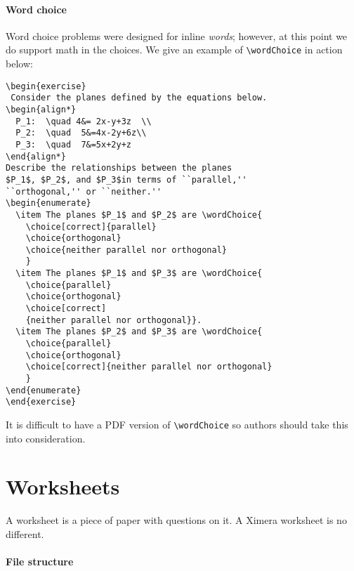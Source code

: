 \documentclass{ximera}
\begin{document}
\paragraph{Word choice}
Word choice problems were designed for inline \textit{words}; however, at this
point we
do support math in the choices. We give an example of \verb!\wordChoice! in
action below:
\begin{verbatim}
\begin{exercise}
 Consider the planes defined by the equations below.
\begin{align*}
  P_1:  \quad 4&= 2x-y+3z  \\
  P_2:  \quad  5&=4x-2y+6z\\ 
  P_3:  \quad  7&=5x+2y+z
\end{align*}
Describe the relationships between the planes 
$P_1$, $P_2$, and $P_3$in terms of ``parallel,'' 
``orthogonal,'' or ``neither.''
\begin{enumerate}
  \item The planes $P_1$ and $P_2$ are \wordChoice{
    \choice[correct]{parallel}
    \choice{orthogonal}
    \choice{neither parallel nor orthogonal}
    }
  \item The planes $P_1$ and $P_3$ are \wordChoice{
    \choice{parallel}
    \choice{orthogonal}
    \choice[correct]
    {neither parallel nor orthogonal}}.
  \item The planes $P_2$ and $P_3$ are \wordChoice{
    \choice{parallel}
    \choice{orthogonal}
    \choice[correct]{neither parallel nor orthogonal}
    }
\end{enumerate}
\end{exercise}
\end{verbatim}
It is difficult to have a PDF version of \verb!\wordChoice! so authors should
take this into consideration.

\section{Worksheets}

A worksheet is a piece of paper with questions on it. A Ximera worksheet is no
different.

\paragraph{File structure}
\end{document}

